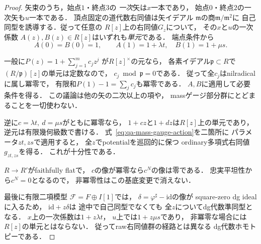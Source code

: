 \begin{proof}
矢束のうち，始点$1$・終点$3$の
\emph{一次}矢は$x$一本であり，
始点$0$・終点$2$の一次矢も$u$一本である．
頂点固定の道代数右同値は矢イデアル
$\mathfrak m$の商$\mathfrak m/\mathfrak m^2$に
自己同型を誘導する．従って任意の
$R[z]$上の右同値$G_z$について，
その$x$と$u$の一次係数
$A(z),B(z)\in R[z]$はいずれも\emph{単元}である．
端点条件から
\[
 A(0)=B(0)=1,\qquad
 A(1)=1+\lambda t,\quad B(1)=1+\mu s.
\]

一般に$P(z)=1+\sum_{j=1}^m c_jz^j$
が$R[z]^\times$の元なら，
各素イデアル$\mathfrak p\subset R$で
$(R/\mathfrak p)[z]$の単元は定数なので，
$c_j\bmod\mathfrak p=0$である．
従って全$c_j$はnilradicalに属し冪零で，
有限和$P(1)-1=\sum_jc_j$も冪零である．
$A,B$に適用して必要条件を得る．
この議論は他の矢の二次以上の項や，
massゲージ部分群にとどまることを一切使わない．

逆に$c=\lambda t,\ d=\mu s$がともに冪零なら，
$1+cz$と$1+dz$は$R[z]$上の単元であり，
逆元は有限幾何級数で書ける．
式~\eqref{eq:qa-mass-gauge-action}を二箇所に
パラメータ$zt,zs$で適用すると，
全$z$でpotentialを巡回的に保つ
ordinary多項式右同値$g_{zt,zs}$を得る．
これが十分性である．

$R\to R'$がfaithfully flatで，
$c$の像が冪零なら$c^N$の像は零である．
忠実平坦性から$c^N=0$となるので，
非冪零性はこの基底変更で消えない．

最後に有限二項模型
$\mathscr F=F\oplus I[1]$では，
$\delta=\varphi^\sharp-\mathrm{id}$の像が
square-zero dg idealに入るため，
$\mathrm{id}+z\delta$は
途中で自己同型でなくても
全$z$についてdg代数準同型となる．
$x$上の一次係数は$1+z\lambda t$，
$u$上では$1+z\mu s$であり，
非冪零な場合には$R[z]$の単元とはならない．
従ってraw右同値群の経路とは異なる
dg代数ホモトピーである．
\end{proof}

